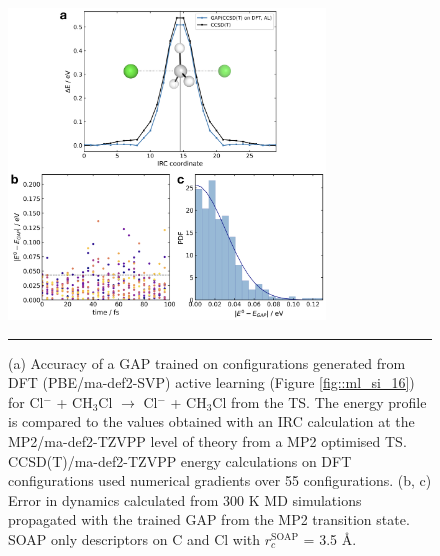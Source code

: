 \documentclass[../../main.tex]{subfiles}
\begin{document}
\begin{figure}[h!]
	\vspace{0.4cm}
	\centering
	\includegraphics[width=0.75\textwidth]{6/gap/figs_si/fig17}
	\vspace{0.2cm}
	\hrule
	\caption{(a) Accuracy of a GAP trained on configurations generated from DFT (PBE/ma-def2-SVP) active learning (Figure \ref{fig::ml_si_16}) for Cl${}^{-}$ + CH${}_{3}$Cl $\rightarrow$ Cl${}^{-}$ + CH${}_{3}$Cl from the TS. The energy profile is compared to the values obtained with an IRC calculation at the MP2/ma-def2-TZVPP level of theory from a MP2 optimised TS. CCSD(T)/ma-def2-TZVPP energy calculations on DFT configurations used numerical gradients over 55 configurations. (b, c) Error in dynamics calculated from 300 K MD simulations propagated with the trained GAP from the MP2 transition state. SOAP only descriptors on C and Cl with $r_c^\text{SOAP}$ = 3.5 \AA.}
	\label{fig::ml_si_17}
\end{figure}
\end{document}
